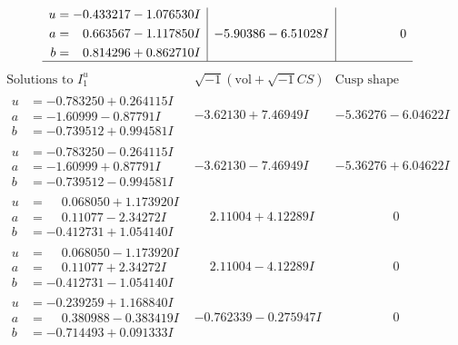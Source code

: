 \documentclass[1p]{elsarticle_modified}
\theoremstyle{definition}
\newcommand{\I}{\sqrt{-1}}
\begin{document}
$$\begin{array}{c|c|c}
\begin{aligned}
u &= -0.433217 - 1.076530 I \\
a &= \phantom{-}0.663567 - 1.117850 I \\
b &= \phantom{-}0.814296 + 0.862710 I\end{aligned}
 & -5.90386 - 6.51028 I & \phantom{-0.000000 } 0\\
 \hline 
 \end{array}$$\newpage$$\begin{array}{c|c|c}  
\text{Solutions to }I^u_{1}& \I (\text{vol} + \sqrt{-1}CS) & \text{Cusp shape}\\
 \hline 
\begin{aligned}
u &= -0.783250 + 0.264115 I \\
a &= -1.60999 - 0.87791 I \\
b &= -0.739512 + 0.994581 I\end{aligned}
 & -3.62130 + 7.46949 I & -5.36276 - 6.04622 I \\ \hline\begin{aligned}
u &= -0.783250 - 0.264115 I \\
a &= -1.60999 + 0.87791 I \\
b &= -0.739512 - 0.994581 I\end{aligned}
 & -3.62130 - 7.46949 I & -5.36276 + 6.04622 I \\ \hline\begin{aligned}
u &= \phantom{-}0.068050 + 1.173920 I \\
a &= \phantom{-}0.11077 - 2.34272 I \\
b &= -0.412731 + 1.054140 I\end{aligned}
 & \phantom{-}2.11004 + 4.12289 I & \phantom{-0.000000 } 0 \\ \hline\begin{aligned}
u &= \phantom{-}0.068050 - 1.173920 I \\
a &= \phantom{-}0.11077 + 2.34272 I \\
b &= -0.412731 - 1.054140 I\end{aligned}
 & \phantom{-}2.11004 - 4.12289 I & \phantom{-0.000000 } 0 \\ \hline\begin{aligned}
u &= -0.239259 + 1.168840 I \\
a &= \phantom{-}0.380988 - 0.383419 I \\
b &= -0.714493 + 0.091333 I\end{aligned}
 & -0.762339 - 0.275947 I & \phantom{-0.000000 } 0 \\ \hline\begin{aligned}

\end{aligned}
\end{array}$$
\end{document}

